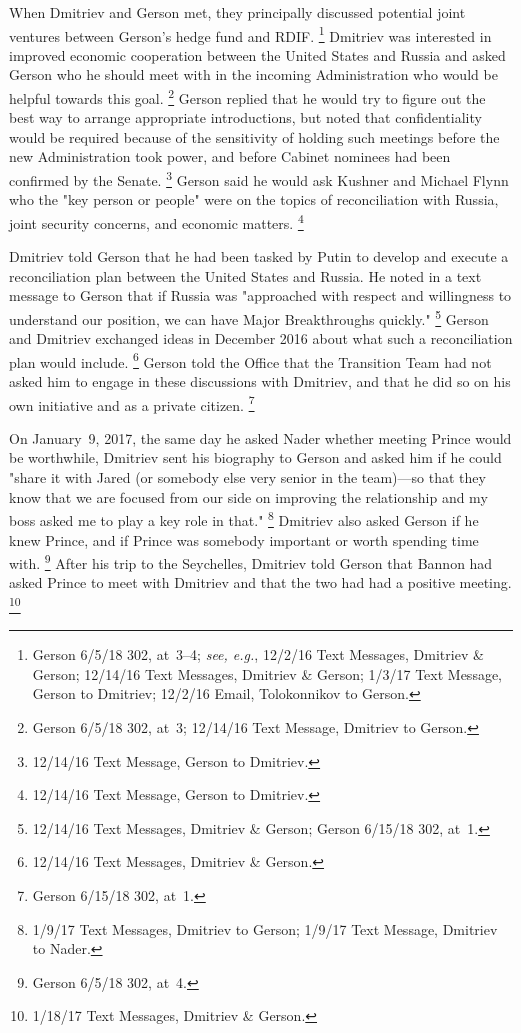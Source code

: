 When Dmitriev and Gerson met, they principally discussed potential joint ventures between Gerson's hedge fund and RDIF\null.%
\footnote{Gerson 6/5/18 302, at~3--4;
\textit{see, e.g.}, 12/2/16 Text Messages, Dmitriev \& Gerson;
12/14/16 Text Messages, Dmitriev \& Gerson;
1/3/17 Text Message, Gerson to Dmitriev;
12/2/16 Email, Tolokonnikov to Gerson.}
Dmitriev was interested in improved economic cooperation between the United States and Russia and asked Gerson who he should meet with in the incoming Administration who would be helpful towards this goal.%
\footnote{Gerson 6/5/18 302, at~3;
12/14/16 Text Message, Dmitriev to Gerson.}
Gerson replied that he would try to figure out the best way to arrange appropriate introductions, but noted that confidentiality would be required because of the sensitivity of holding such meetings before the new Administration took power, and before Cabinet nominees had been confirmed by the Senate.%
\footnote{12/14/16 Text Message, Gerson to Dmitriev.}
Gerson said he would ask Kushner and Michael Flynn who the "key person or people" were on the topics of reconciliation with Russia, joint security concerns, and economic matters.%
\footnote{12/14/16 Text Message, Gerson to Dmitriev.}

Dmitriev told Gerson that he had been tasked by Putin to develop and execute a reconciliation plan between the United States and Russia.
He noted in a text message to Gerson that if Russia was "approached with respect and willingness to understand our position, we can have Major Breakthroughs quickly."%
\footnote{12/14/16 Text Messages, Dmitriev \& Gerson;
Gerson 6/15/18 302, at~1.}
Gerson and Dmitriev exchanged ideas in December 2016 about what such a reconciliation plan would include.%
\footnote{12/14/16 Text Messages, Dmitriev \& Gerson.}
Gerson told the Office that the Transition Team had not asked him to engage in these discussions with Dmitriev, and that he did so on his own initiative and as a private citizen.%
\footnote{Gerson 6/15/18 302, at~1.}

On January~9, 2017, the same day he asked Nader whether meeting Prince would be worthwhile, Dmitriev sent his biography to Gerson and asked him if he could "share it with Jared (or somebody else very senior in the team)---so that they know that we are focused from our side on improving the relationship and my boss asked me to play a key role in that."%
\footnote{1/9/17 Text Messages, Dmitriev to Gerson;
1/9/17 Text Message, Dmitriev to Nader.}
Dmitriev also asked Gerson if he knew Prince, and if Prince was somebody important or worth spending time with.%
\footnote{Gerson 6/5/18 302, at~4.}
After his trip to the Seychelles, Dmitriev told Gerson that Bannon had asked Prince to meet with Dmitriev and that the two had had a positive meeting.%
\footnote{1/18/17 Text Messages, Dmitriev \& Gerson.}

